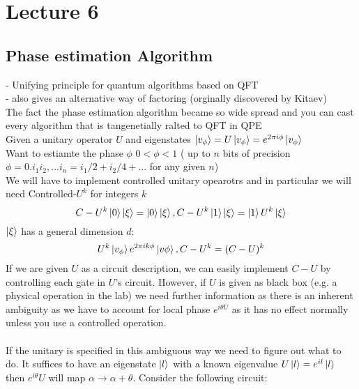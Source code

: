\documentclass{article}
\begin{document}
{\section{Lecture 6}
\subsection{Phase estimation Algorithm}
- Unifying principle for quantum algorithms based on QFT\\
- also gives an alternative way of factoring (orginally discovered  by Kitaev)\\
The fact the phase estimation algorithm became so wide spread and you can cast every algorithm that is tangenetially ralted to QFT in QPE\\
Given a unitary operator $U$ and eigenstates $\ket{v_{\phi}} = U\ket{v_{\phi}} = e^{2\pi i \phi} \ket{v_{\phi}}$\\
Want to estiamte the phase $\phi$ $0< \phi< 1$  ( up to $n$ bits of precision $\phi = 0. i_1 i_2,...i_n = i_1/2 + i_2/4 + ...$ for any given $n$)\\
We will have to implement controlled unitary opearotrs and in particular we will need Controlled-$U^k$ for integers $k$
$$
C-U^k \ket{0} \ket{\xi} = \ket{0}\ket{\xi}, C-U^k \ket{1}\ket{\xi} = \ket{1} U^k \ket{\xi}
$$
$\ket{\xi}$ has a general dimension $d$:
$$
U^k \ket{v_{\phi}} e^{2\pi i k \phi} \ket{v \phi}, C-U^k = (C-U)^k
$$
If we are given $U$ as a circuit description, we can easily implement $C-U$ by controlling each gate in $U$'s circuit. However, if $U$ is given as black box (e.g. a physical operation in the lab) we need further information as there is an inherent ambiguity as we have to account for local phase $e^{i\theta U}$ as it has no effect normally unless you use a controlled operation. \\\\
        If the unitary is specified in this ambiguous way we need to figure out what to do. It suffices to have an eigenstate $\ket{l}$ with a known eigenvalue $U\ket{l} = e^{i l} \ket{l}$ then $e^{i \theta} U$ will map $\alpha \rightarrow \alpha + \theta$. Consider the following circuit:
       
}
\end{document}
